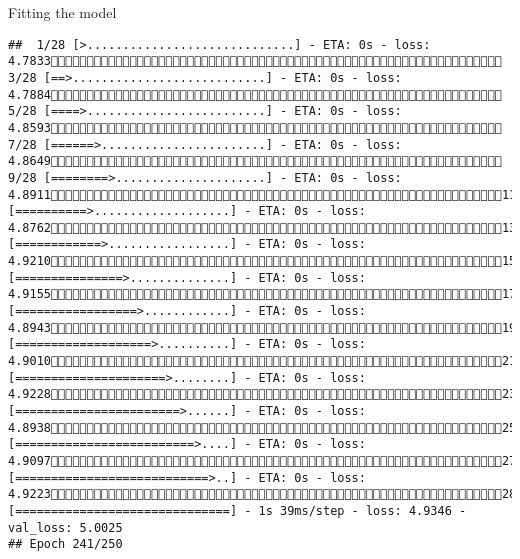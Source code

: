 \documentclass[
  ignorenonframetext,
]{beamer}
\begin{document}
\begin{frame}[fragile]{Fitting the model}
\begin{verbatim}
##  1/28 [>.............................] - ETA: 0s - loss: 4.7833 3/28 [==>...........................] - ETA: 0s - loss: 4.7884 5/28 [====>.........................] - ETA: 0s - loss: 4.8593 7/28 [======>.......................] - ETA: 0s - loss: 4.8649 9/28 [========>.....................] - ETA: 0s - loss: 4.891111/28 [==========>...................] - ETA: 0s - loss: 4.876213/28 [============>.................] - ETA: 0s - loss: 4.921015/28 [===============>..............] - ETA: 0s - loss: 4.915517/28 [=================>............] - ETA: 0s - loss: 4.894319/28 [===================>..........] - ETA: 0s - loss: 4.901021/28 [=====================>........] - ETA: 0s - loss: 4.922823/28 [=======================>......] - ETA: 0s - loss: 4.893825/28 [=========================>....] - ETA: 0s - loss: 4.909727/28 [===========================>..] - ETA: 0s - loss: 4.922328/28 [==============================] - 1s 39ms/step - loss: 4.9346 - val_loss: 5.0025
## Epoch 241/250

\end{verbatim}
\end{frame}
\end{document}
